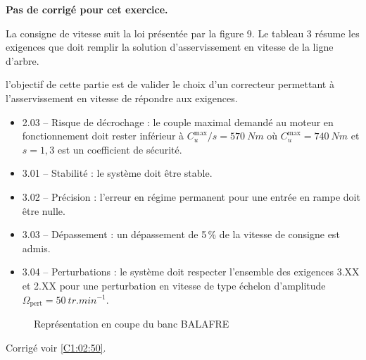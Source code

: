 \normalfalse \difficiletrue \tdifficilefalse
\correctionfalse



\setcounter{numques}{0}
\ifcorrection
\else
\textbf{Pas de corrigé pour cet exercice.}
\fi

\ifprof
\else

La consigne de vitesse suit la loi présentée par la figure 9.
Le tableau 3 résume les exigences que doit remplir la solution d’asservissement en vitesse
de la ligne d’arbre.


\begin{obj}
l’objectif de cette partie est de valider le choix d’un correcteur permettant à
l’asservissement en vitesse de répondre aux exigences.
\end{obj}

\begin{itemize}
\item 2.03 -- Risque de décrochage : le couple maximal demandé au moteur en fonctionnement doit
rester inférieur à $C^{\text{max}}_u /s = \SI{570}{Nm}$ où $C^{\text{max}}_u = \SI{740}{Nm}$ et
$s = 1,3$ est un coefficient de sécurité.
\item 3.01 -- Stabilité : le système doit être stable.
\item 3.02 -- Précision : l’erreur en régime permanent pour une entrée en rampe doit
être nulle.
\item 3.03 -- Dépassement : un dépassement de 5\,\% de la vitesse de consigne est admis.
\item 3.04 -- Perturbations : le système doit respecter l’ensemble des exigences 3.XX et
2.XX pour une perturbation en vitesse de type échelon d’amplitude $\Omega_{\text{pert}} = \SI{50}{tr.min^{-1}}$.
\end{itemize}

 
\begin{figure}[H]
\centering
\caption{Représentation en coupe du banc BALAFRE \label{fig_50_01}}
\end{figure}
\fi








\ifprof
\else
\begin{flushright}
\footnotesize{Corrigé  voir \ref{C1:02:50}.}
\end{flushright}%
\fi